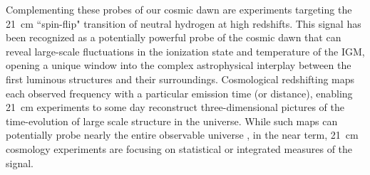 \documentclass[twocolumn,numberedappendix]{emulateapj} \shorttitle{PSA64}
\begin{document}
Complementing these probes of our cosmic dawn are experiments targeting
the 21~cm ``spin-flip" transition of neutral hydrogen at high redshifts.
This signal has been recognized as a potentially powerful probe
of the cosmic dawn \citep{pritchard_loeb2012,morales_wyithe2010,furlanetto_et_al2006} that can reveal
large-scale fluctuations in the ionization state and temperature of the IGM, opening
a unique window into the complex astrophysical interplay between the first luminous
structures and their surroundings.
Cosmological redshifting maps 
each observed frequency with a particular emission time (or distance), enabling 21~cm experiments 
to some day reconstruct 
three-dimensional pictures of the time-evolution of large scale structure in the universe. 
While such maps can potentially probe nearly the entire observable universe \citep{mao_et_al2010},
in the near term, 21~cm cosmology experiments are focusing on statistical or integrated measures
of the signal.

\end{document}
